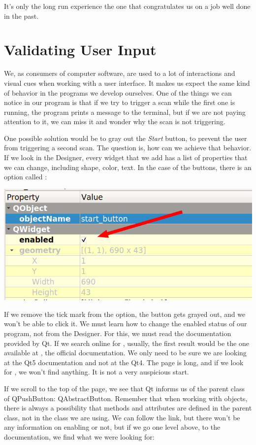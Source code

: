 It's only the long run experience the one that congratulates us on a job well done in the past.

\section{Validating User Input}\label{sec:validating-user-input}
We, as consumers of computer software, are used to a lot of interactions and visual cues when working with a user interface. It makes us expect the same kind of behavior in the programs we develop ourselves. One of the things we can notice in our program is that if we try to trigger a scan while the first one is running, the program prints a message to the terminal, but if we are not paying attention to it, we can miss it and wonder why the scan is not triggering.

One possible solution would be to gray out the \emph{Start} button, to prevent the user from triggering a second scan. The question is, how can we achieve that behavior. If we look in the Designer, every widget that we add has a list of properties that we can change, including shape, color, text. In the case of the buttons, there is an option called :

\begin{center}
    \includegraphics[width=.4\linewidth]{images/Chapter_09/10_enabled_button.png}
\end{center}

If we remove the tick mark from the option, the button gets grayed out, and we won't be able to click it. We must learn how to change the enabled status of our program, not from the Designer. For this, we must read the documentation provided by Qt. If we search online for , usually, the first result would be the one available at , the official documentation. We only need to be sure we are looking at the Qt5 documentation and not at the Qt4. The page is long, and if we look for , we won't find anything. It is not a very auspicious start.

If we scroll to the top of the page, we see that Qt informs us of the parent class of QPushButton: QAbstractButton. Remember that when working with objects, there is always a possibility that methods and attributes are defined in the parent class, not in the class we are using. We can follow the link, but there won't be any information on enabling or not, but if we go one level above, to the  documentation, we find what we were looking for:

